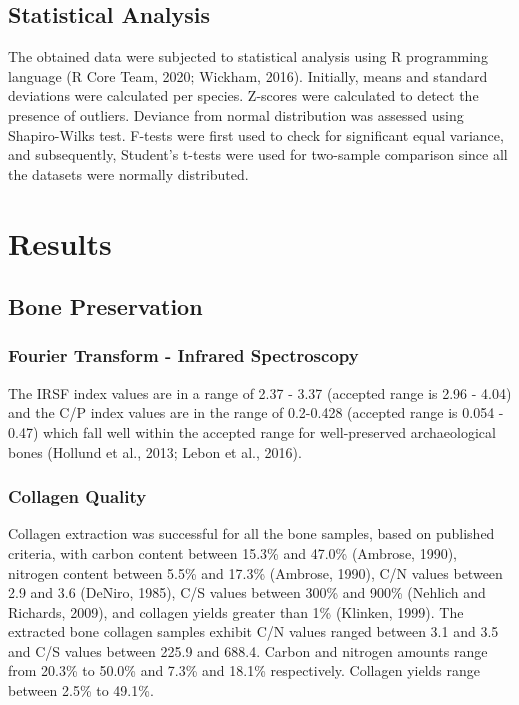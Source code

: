 \documentclass[3p]{elsarticle} %
\begin{document}
\hypertarget{statistical-analysis}{%
\subsection{Statistical Analysis}\label{statistical-analysis}}

The obtained data were subjected to statistical analysis using R programming language (R Core Team, 2020; Wickham, 2016). Initially, means and standard deviations were calculated per species. Z-scores were calculated to detect the presence of outliers. Deviance from normal distribution was assessed using Shapiro-Wilks test. F-tests were first used to check for significant equal variance, and subsequently, Student's t-tests were used for two-sample comparison since all the datasets were normally distributed.

\hypertarget{results}{%
\section{Results}\label{results}}

\hypertarget{bone-preservation}{%
\subsection{Bone Preservation}\label{bone-preservation}}

\hypertarget{fourier-transform---infrared-spectroscopy}{%
\subsubsection{Fourier Transform - Infrared Spectroscopy}\label{fourier-transform---infrared-spectroscopy}}

The IRSF index values are in a range of 2.37 - 3.37 (accepted range is 2.96 - 4.04) and the C/P index values are in the range of 0.2-0.428 (accepted range is 0.054 - 0.47) which fall well within the accepted range for well-preserved archaeological bones (Hollund et al., 2013; Lebon et al., 2016).

\hypertarget{collagen-quality}{%
\subsubsection{Collagen Quality}\label{collagen-quality}}

Collagen extraction was successful for all the bone samples, based on published criteria, with carbon content between 15.3\% and 47.0\% (Ambrose, 1990), nitrogen content between 5.5\% and 17.3\% (Ambrose, 1990), C/N values between 2.9 and 3.6 (DeNiro, 1985), C/S values between 300\% and 900\% (Nehlich and Richards, 2009), and collagen yields greater than 1\% (Klinken, 1999). The extracted bone collagen samples exhibit C/N values ranged between 3.1 and 3.5 and C/S values between 225.9 and 688.4. Carbon and nitrogen amounts range from 20.3\% to 50.0\% and 7.3\% and 18.1\% respectively. Collagen yields range between 2.5\% to 49.1\%.
\end{document}
